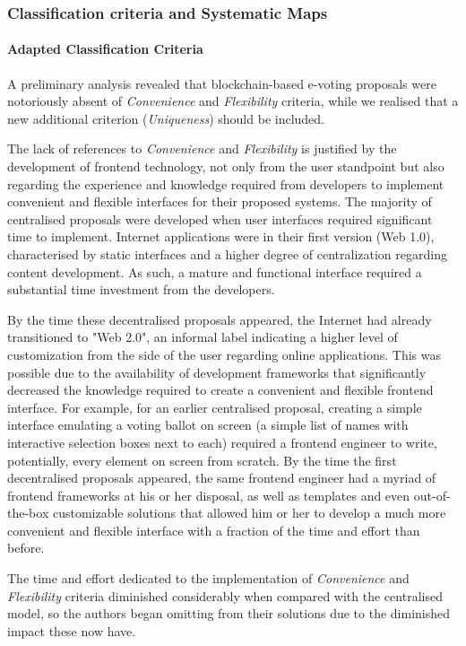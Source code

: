 \documentclass[../access.tex]{subfiles}
\begin{document}
\subsubsection{Classification criteria and Systematic Maps}

\paragraph{Adapted Classification Criteria}
A preliminary analysis revealed that blockchain-based e-voting proposals were notoriously absent of \textit{Convenience} and \textit{Flexibility} criteria, while we realised that a new additional criterion (\textit{Uniqueness}) should be included.
\par
The lack of references to \textit{Convenience} and \textit{Flexibility} is justified by the development of frontend technology, not only from the user standpoint but also regarding the experience and knowledge required from developers to implement convenient and flexible interfaces for their proposed systems. The majority of centralised proposals were developed when user interfaces required significant time to implement. Internet applications were in their first version (Web 1.0), characterised by static interfaces and a higher degree of centralization regarding content development. As such, a mature and functional interface required a substantial time investment from the developers.
\par
By the time these decentralised proposals appeared, the Internet had already transitioned to "Web 2.0", an informal label indicating a higher level of customization from the side of the user regarding online applications. This was possible due to the availability of development frameworks that significantly decreased the knowledge required to create a convenient and flexible frontend interface. For example, for an earlier centralised proposal, creating a simple interface emulating a voting ballot on screen (a simple list of names with interactive selection boxes next to each) required a frontend engineer to write, potentially, every element on screen from scratch. By the time the first decentralised proposals appeared, the same frontend engineer had a myriad of frontend frameworks at his or her disposal, as well as templates and even out-of-the-box customizable solutions that allowed him or her to develop a much more convenient and flexible interface with a fraction of the time and effort than before.
\par
The time and effort dedicated to the implementation of \textit{Convenience} and \textit{Flexibility} criteria diminished considerably when compared with the centralised model, so the authors began omitting from their solutions due to the diminished impact these now have.
\end{document}
